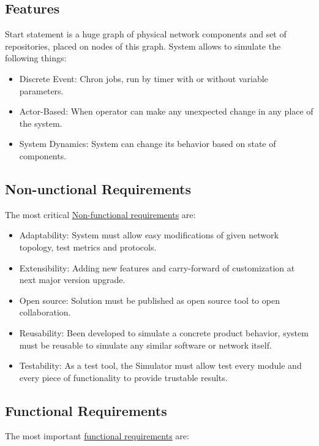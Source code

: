 \documentclass[12pt,oneside]{article}
\begin{document}
\subsection{Features}
\label{sec:features}
Start statement is a huge graph of physical network components and set of repositories, placed on nodes of this graph. System allows to simulate the following things:
\begin{itemize}
    \item Discrete Event: Chron jobs, run by timer with or without variable parameters.
    \item Actor-Based: When operator can make any unexpected change in any place of the system.
    \item System Dynamics: System can change its behavior based on state of components.
\end{itemize}

\subsection{Non-unctional Requirements}
\label{sec:nfr}
The most critical
\href{https://en.wikipedia.org/wiki/Non-functional_requirement}{Non-functional requirements}
are:
\begin{itemize}
    \item Adaptability: System must allow easy modifications of given network topology, test metrics and protocols.
    \item Extensibility: Adding new features and carry-forward of customization at next major version upgrade.
    \item Open source: Solution must be published as open source tool to open collaboration.
    \item Reusability: Been developed to simulate a concrete product behavior, system must be reusable to simulate any similar software or network itself.
    \item Testability: As a test tool, the Simulator must allow test every module and every piece of functionality to provide trustable results.
\end{itemize}

\subsection{Functional Requirements}
\label{sec:fr}

The most important \href{https://en.wikipedia.org/wiki/Functional_requirement}{functional requirements} are:
\end{document}
